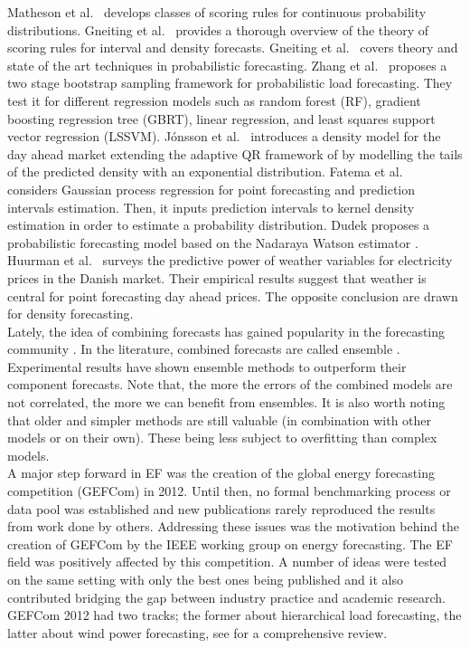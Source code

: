 Matheson et al.\ \cite{matheson1976scoring} develops classes of scoring rules for continuous probability distributions.
Gneiting et al.\ \cite{gneiting2007strictly}
provides a thorough overview of the theory of scoring rules for interval and density forecasts.
Gneiting et al.\ \cite{gneiting2014probabilistic}
covers theory and state of the art techniques in probabilistic forecasting.
Zhang et al.\ \cite{zhang2020two} proposes a two stage bootstrap sampling framework for probabilistic load forecasting. They test it for different regression models such as random forest (RF), gradient boosting regression tree (GBRT), linear regression, and least squares support vector regression (LSSVM).
Jónsson et al.\ \cite{jonsson2014predictive}
introduces a density model for the day ahead market extending the adaptive QR framework of \cite{moller2008time} by modelling the tails of the predicted density with an exponential distribution.
Fatema et al.\ \cite{fatema2023probabilistic} considers Gaussian process regression for point forecasting and prediction intervals estimation. Then, it inputs prediction intervals to kernel density estimation in order to estimate a probability distribution.
Dudek \cite{dudek2018probabilistic} proposes a probabilistic forecasting model based on the Nadaraya Watson estimator \cite{nadaraya1964estimating,watson1964smooth}.
Huurman et al.\ \cite{huurman2012power} surveys the predictive power of weather variables for electricity prices in the Danish market. Their empirical results suggest that weather is central for point forecasting day ahead prices. The opposite conclusion are drawn for density forecasting.
\\
Lately, the idea of combining forecasts has gained popularity in the forecasting community \cite{forecasting_big}. In the literature, combined forecasts are called ensemble \cite{gneiting_weather_ensemble}.
Experimental results have shown ensemble methods to outperform their component forecasts.
Note that, the more the errors of the combined models are not correlated, the more we can benefit from ensembles.
It is also worth noting that older and simpler methods are still valuable (in combination with other models or on their own). These being less subject to overfitting than complex models.
\\
A major step forward in EF was the creation of the global energy forecasting competition (GEFCom) in 2012. Until then, no formal benchmarking process or data pool was established and new publications rarely reproduced the results from work done by others. Addressing these issues was the motivation behind the creation of GEFCom by the IEEE working group on energy forecasting. The EF field was positively affected by this competition. A number of ideas were tested on the same setting with only the best ones being published and it also contributed bridging the gap between industry practice and academic research. GEFCom 2012 had two tracks; the former about hierarchical load forecasting, the latter about wind power forecasting, see \cite{hong2014global} for a comprehensive review. 
